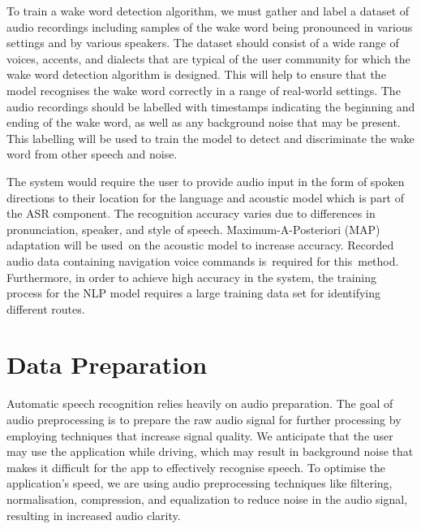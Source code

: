 \documentclass{epsrc}
\begin{document}
To train a wake word detection algorithm, we must gather and label a dataset of audio recordings including samples of the wake word being pronounced in various settings and by various speakers. The dataset should consist of a wide range of voices, accents, and dialects that are typical of the user community for which the wake word detection algorithm is designed. This will help to ensure that the model recognises the wake word correctly in a range of real-world settings. The audio recordings should be labelled with timestamps indicating the beginning and ending of the wake word, as well as any background noise that may be present. This labelling will be used to train the model to detect and discriminate the wake word from other speech and noise.
\vspace{5pt}

The system would require the user to provide audio input in the form of spoken directions to their location for the language and acoustic model which is part of the ASR component. The recognition accuracy varies due to differences in pronunciation, speaker, and style of speech. Maximum-A-Posteriori (MAP) adaptation will be used on the acoustic model to increase accuracy. Recorded audio data containing navigation voice commands is required for this method. Furthermore, in order to achieve high accuracy in the system, the training process for the NLP model requires a large training data set for identifying different routes.
\vspace{5pt}

\section{Data Preparation}
\vspace{5pt}

Automatic speech recognition relies heavily on audio preparation. The goal of audio preprocessing is to prepare the raw audio signal for further processing by employing techniques that increase signal quality. We anticipate that the user may use the application while driving, which may result in background noise that makes it difficult for the app to effectively recognise speech. To optimise the application's speed, we are using audio preprocessing techniques like filtering, normalisation, compression, and equalization to reduce noise in the audio signal, resulting in increased audio clarity.
\vspace{5pt}
\end{document}
